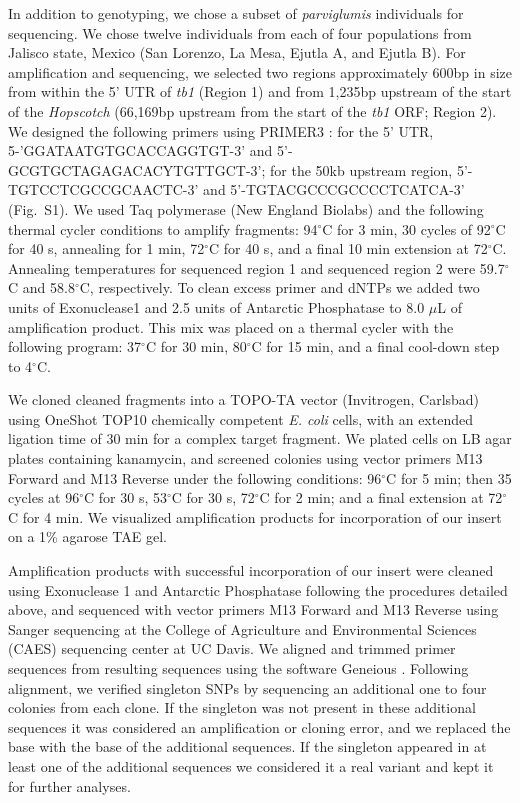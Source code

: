 \documentclass[11pt]{article}
\begin{document}
\begin{linenumbers}
\begin{flushleft}
In addition to genotyping, we chose a subset of \emph{parviglumis} individuals for sequencing. We chose twelve individuals from each of four populations from Jalisco state, Mexico (San Lorenzo, La Mesa, Ejutla A, and Ejutla B). For amplification and sequencing, we selected two regions approximately 600bp in size from within the 5' UTR of \emph{tb1} (Region 1) and from 1,235bp upstream of the start of the \emph{Hopscotch} (66,169bp upstream from the start of the \emph{tb1} ORF; Region 2). We designed the following primers using PRIMER3 \citep{RozenSkaletsky2000}: for the 5' UTR, {\small 5-'GGATAATGTGCACCAGGTGT-3'} and {\small 5'-GCGTGCTAGAGACACYTGTTGCT-3'}; for the 50kb upstream region, {\small 5'-TGTCCTCGCCGCAACTC-3'} and {\small 5'-TGTACGCCCGCCCCTCATCA-3'} (Fig.~S1). We used Taq polymerase (New England Biolabs) and the following thermal cycler conditions to amplify fragments: 94$^{\circ}$C for 3 min, 30 cycles of 92$^{\circ}$C for 40 s, annealing for 1 min, 72$^{\circ}$C for 40 s, and a final 10 min extension at 72$^{\circ}$C. Annealing temperatures for sequenced region 1 and sequenced region 2 were 59.7$^{\circ}$C and 58.8$^{\circ}$C, respectively. To clean excess primer and dNTPs we added two units of Exonuclease1 and 2.5 units of Antarctic Phosphatase to 8.0 $\mu$L of amplification product. This mix was placed on a thermal cycler with the following program: 37$^{\circ}$C for 30 min, 80$^{\circ}$C for 15 min, and a final cool-down step to 4$^{\circ}$C. 

We cloned cleaned fragments into a TOPO-TA vector (Invitrogen, Carlsbad) using OneShot TOP10 chemically competent \emph{E. coli} cells, with an extended ligation time of 30 min for a complex target fragment. We plated cells on LB agar plates containing kanamycin, and screened colonies using vector primers M13 Forward and M13 Reverse under the following conditions: 96$^{\circ}$C for 5 min; then 35 cycles at 96$^{\circ}$C for 30 s, 53$^{\circ}$C for 30 s, 72$^{\circ}$C for 2 min; and a final extension at 72$^{\circ}$C for 4 min. We visualized amplification products for incorporation of our insert on a 1\% agarose TAE gel.

Amplification products with successful incorporation of our insert were cleaned using Exonuclease 1 and Antarctic Phosphatase following the procedures detailed above, and sequenced with vector primers M13 Forward and M13 Reverse using Sanger sequencing at the College of Agriculture and Environmental Sciences (CAES) sequencing center at UC Davis. We aligned and trimmed primer sequences from resulting sequences using the software Geneious \citep{Kearse2012}. Following alignment, we verified singleton SNPs by sequencing an additional one to four colonies from each clone. If the singleton was not present in these additional sequences it was considered an amplification or cloning error, and we replaced the base with the base of the additional sequences. If the singleton appeared in at least one of the additional sequences we considered it a real variant and kept it for further analyses. 


\end{flushleft}
\end{linenumbers}
\end{document}
